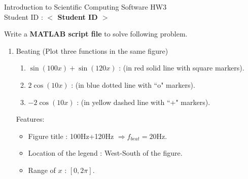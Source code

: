 \documentclass[12pt,a4paper]{article}
\newcommand{\placeholder}[1]{\textbf{$<$ #1 $>$}}
\newcommand{\idnumber}{\placeholder{Student ID}}
\begin{document}
\begin{flushleft}Introduction to Scientific Computing Software HW3
\\Student ID : \idnumber{}\end{flushleft}

Write a \textbf{MATLAB script file} to solve following problem.
\begin{enumerate}
\item Beating (Plot three functions in the same figure)
\begin{enumerate} 
\item $\sin(100x)+\sin(120x)$ : (in red solid line with square markers).

\item $2\cos(10x)$ : (in blue dotted line with ``o" markers).
\item $-2\cos(10x)$ : (in yellow dashed line with ``+" markers).
\end{enumerate}
Features:
\begin{itemize}
\item Figure title : 100Hz+120Hz $\Rightarrow f_{beat}=20$Hz.
\item Location of the legend : West-South of the figure.
\item Range of $x $ : $[0,2\pi]$.
\end{itemize}
\end{enumerate}
\end{document}
